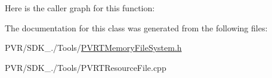 Here is the caller graph for this function\+:




The documentation for this class was generated from the following files\+:\begin{DoxyCompactItemize}
\item 
P\+V\+R/\+S\+D\+K\+\_./\+Tools/\hyperlink{_p_v_r_t_memory_file_system_8h}{P\+V\+R\+T\+Memory\+File\+System.\+h}\item 
P\+V\+R/\+S\+D\+K\+\_./\+Tools/P\+V\+R\+T\+Resource\+File.\+cpp\end{DoxyCompactItemize}
